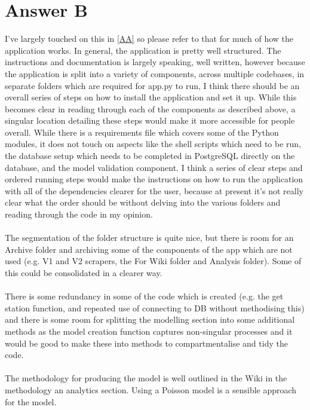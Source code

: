 \documentclass{scrreprt}
\begin{document}
\section{Answer B}\label{AB}
I've largely touched on this in \ref{AA} so please refer to that for much of how the application works. In general, the application is pretty well structured. The instructions and documentation is largely speaking, well written, however because the application is split into a variety of components, across multiple codebases, in separate folders which are required for app.py to run, I think there should be an overall series of steps on how to install the application and set it up. While this becomes clear in reading through each of the components as described above, a singular location detailing these steps would make it more accessible for people overall. While there is a requirements file which covers some of the Python modules, it does not touch on aspects like the shell scripts which need to be run, the database setup which needs to be completed in PostgreSQL directly on the database, and the model validation component. I think a series of clear steps and ordered running steps would make the instructions on how to run the application with all of the dependencies clearer for the user, because at present it's not really clear what the order should be without delving into the various folders and reading through the code in my opinion. \\
\\
The segmentation of the folder structure is quite nice, but there is room for an Archive folder and archiving some of the components of the app which are not used (e.g. V1 and V2 scrapers, the For Wiki folder and Analysis folder). Some of this could be consolidated in a clearer way.\\
\\
There is some redundancy in some of the code which is created (e.g. the get station function, and repeated use of connecting to DB without methodising this) and there is some room for splitting the modelling section into some additional methods as the model creation function captures non-singular processes and it would be good to make these into methods to compartmentalise and tidy the code.\\
\\
The methodology for producing the model is well outlined in the Wiki in the methodology an analytics section. Using a Poisson model is a sensible approach for the model.\\
\\
\end{document}
